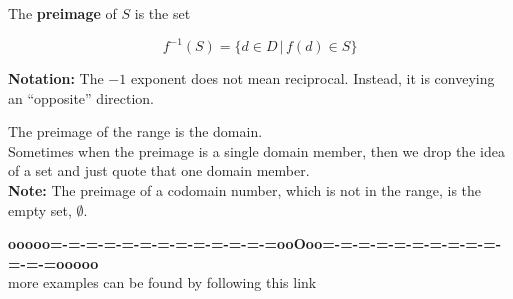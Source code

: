 \documentclass{ximera}
\begin{document}
The \textbf{preimage} of $S$ is the set

\[  f^{-1}(S) = \{ d \in D \, | \, f(d) \in S  \}    \]

\textbf{Notation:}  The $-1$ exponent does not mean reciprocal.  Instead, it is conveying an ``opposite'' direction.


The preimage of the range is the domain. \\

Sometimes when the preimage is a single domain member, then we drop the idea of a set and just quote that one domain member. \\


\textbf{Note:} The preimage of a codomain number, which is not in the range, is the empty set, $\emptyset$. \\




















\begin{center}
\textbf{\textcolor{green!50!black}{ooooo=-=-=-=-=-=-=-=-=-=-=-=-=ooOoo=-=-=-=-=-=-=-=-=-=-=-=-=ooooo}} \\

more examples can be found by following this link\\ 

\end{center}
\end{document}
